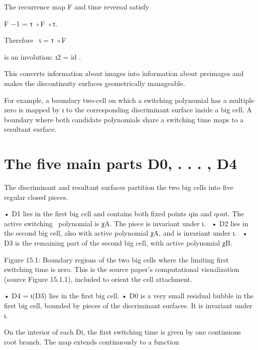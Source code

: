 The recurrence map F and time reversal satisfy


\begin{displaytext}
F −1 = τ ◦F ◦τ.
\end{displaytext}

\begin{displaytext}
Therefore \
ι = τ ◦F
\end{displaytext}

is an involution: ι2 = id .


This converts information about images into information about preimages and makes the discontinuity surfaces geometrically manageable.


For example, a boundary two-cell on which a switching polynomial has a multiple zero is mapped by ι to the corresponding discriminant surface inside a big cell. A boundary where both candidate polynomials share a switching time maps to a resultant surface.


\section{The five main parts D0, . . . , D4}

The discriminant and resultant surfaces partition the two big cells into five regular closed pieces.


\begin{displaytext}
• D1 lies in the first big cell and contains both fixed points qin and qout. The active switching \
polynomial is χA. The piece is invariant under ι. \
• D2 lies in the second big cell, also with active polynomial χA, and is invariant under ι. \
• D3 is the remaining part of the second big cell, with active polynomial χB.
\end{displaytext}

\begin{figureplaceholder}
Figure 15.1: Boundary regions of the two big cells where the limiting first switching time is zero. This is the source paper’s computational visualization (source Figure 15.1.1), included to orient the cell attachment.
\end{figureplaceholder}

• D4 = ι(D3) lies in the first big cell. • D0 is a very small residual bubble in the first big cell, bounded by pieces of the discriminant surfaces. It is invariant under ι.


On the interior of each Di, the first switching time is given by one continuous root branch. The map extends continuously to a function


